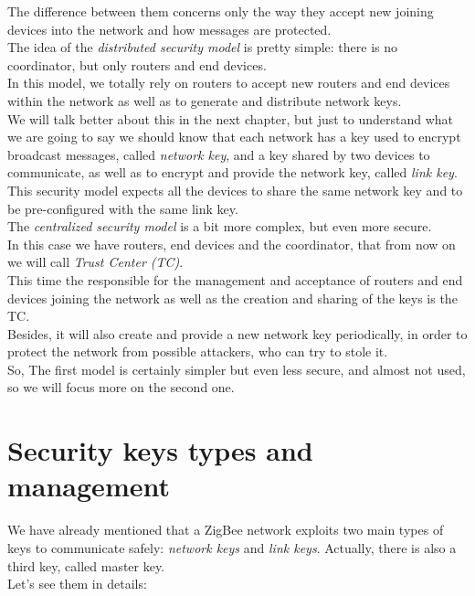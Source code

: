 \documentclass[12pt]{report}
\begin{document}
{The difference between them concerns only the way they accept new joining devices into the network and how messages are protected.\\

The idea of the \emph{distributed security model} is pretty simple: there is no coordinator, but only routers and end devices.\\
In this model, we totally rely on routers to accept new routers and end devices within the network as well as to generate and distribute network keys.\\
We will talk better about this in the next chapter, but just to understand what we are going to say we should know that each network has a key used to encrypt broadcast messages, called \emph{network key}, and a key shared by two devices to communicate, as well as to encrypt and provide the network key, called \emph{link key}.\\
This security model expects all the devices to share the same network key and to be pre-configured with the same link key.\\

The \emph{centralized security model} is a bit more complex, but even more secure.\\
In this case we have routers, end devices and the coordinator, that from now on we will call \emph{Trust Center (TC)}.\\
This time the responsible for the management and acceptance of routers and end devices joining the network as well as the creation and sharing of the keys is the TC.\\
Besides, it will also create and provide a new network key periodically, in order to protect the network from possible attackers, who can try to stole it.\\

So, The first model is certainly simpler but even less secure, and almost not used, so we will focus more on the second one}.\\

\section{Security keys types and management}
\bigskip
We have already mentioned that a ZigBee network exploits two main types of keys to communicate safely: \emph{network keys} and \emph{link keys}. Actually, there is also a third key, called master key.\\
Let's see them in details:
\end{document}
